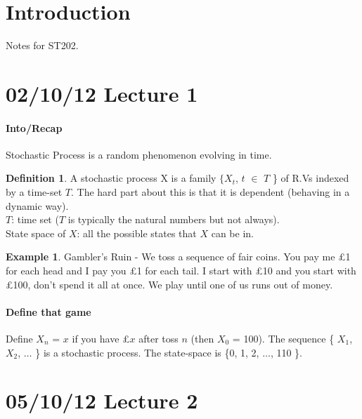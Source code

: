 \documentclass{article}
\theoremstyle{definition}
\newtheorem{defn}[thm]{Definition}
\newtheorem{ex}[thm]{Example}
\begin{document}
\maketitle
\tableofcontents

\section{Introduction}
Notes for ST202.
\clearpage

\section{02/10/12 Lecture 1}

\paragraph*{Into/Recap}

Stochastic Process is a random phenomenon evolving in time.

\begin{defn} A stochastic process X is a family $\{ X_t$, $t$ $\in$ $T$ \} of R.Vs indexed by a time-set $T$. The hard part about this is that it is dependent (behaving in a dynamic way).\\

$T$: time set ($T$ is typically the natural numbers but not always).\\

State space of $X$: all the possible states that $X$ can be in.\\
\end{defn}

\begin{ex}
Gambler's Ruin - We toss a sequence of fair coins. You pay me £1 for each head and I pay you £1 for each tail. I start with £10 and you start with £100, don't spend it all at once. We play until one of us runs out of money.

\paragraph*{Define that game}

Define $X_n$ = $x$ if you have £$x$ after toss $n$ (then $X_0$ = 100). The sequence \{ $X_1$, $X_2$, $\ldots$ \} is a stochastic process. The state-space is \{0, 1, 2, $\ldots$, 110 \}.
\end{ex}

\section{05/10/12 Lecture 2}
\end{document}
